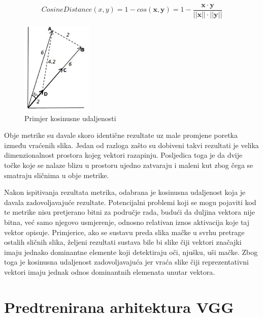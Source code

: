 \documentclass[times, utf8, proizvoljni, numeric]{fer}
\begin{document}
\begin{equation}
\label{eq:kosinusna_udaljenost}
CosineDistance(x,y) = 1- cos(\pmb x, \pmb y) = 1 - \frac {\pmb x \cdot \pmb y}{||\pmb x|| \cdot ||\pmb y||}
\end{equation}

\begin{figure}[!ht]
	\begin{center}
		\captionsetup{justification=centering}
		\includegraphics[width=0.3\textwidth]{./imgs/kosinusna_udaljenost.png}
		\caption{Primjer kosinusne udaljenosti \cite{VectorSimilarity}}
		\label{fg:kosinusna_udaljenost}
	\end{center}
\end{figure}

Obje metrike su davale skoro identične rezultate uz male promjene poretka između vraćenih slika. Jedan od razloga zašto su dobiveni takvi rezultati je velika dimenzionalnost prostora kojeg vektori razapinju. Posljedica toga je da dvije točke koje se nalaze blizu u prostoru ujedno zatvaraju i maleni kut zbog čega se smatraju sličnima u obje metrike.	

Nakon ispitivanja rezultata metrika, odabrana je kosinusna udaljenost koja je davala zadovoljavajuće rezultate. Potencijalni problemi koji se mogu pojaviti kod te metrike nisu pretjerano bitni za područje rada, budući da duljina vektora nije bitna, već samo njegovo usmjerenje, odnosno relativan iznos aktivacija koje taj vektor opisuje. Primjerice, ako se sustavu preda slika mačke u svrhu pretrage ostalih sličnih slika, željeni rezultati sustava bile bi slike čiji vektori značajki imaju jednako dominantne elemente koji detektiraju oči, njušku, uši mačke. Zbog toga je kosinusna udaljenost zadovoljavajuća jer vraća slike čiji reprezentativni vektori imaju jednak odnos dominantnih elemenata unutar vektora.


\section{Predtrenirana arhitektura VGG}
\end{document}
